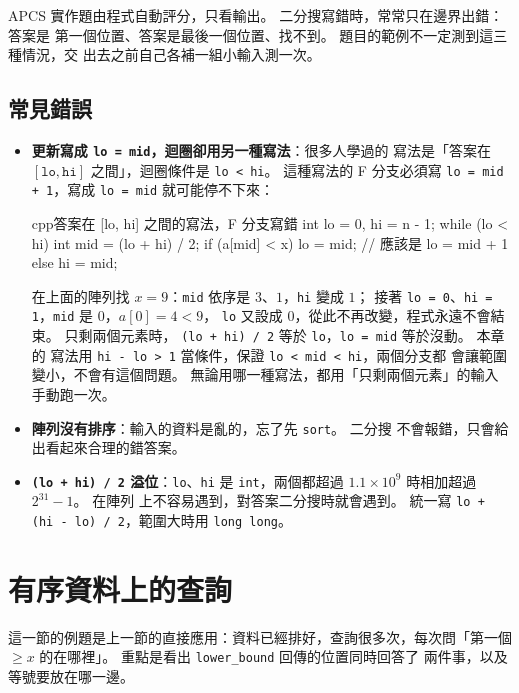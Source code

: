 \begin{apcsnote}
APCS 實作題由程式自動評分，只看輸出。 二分搜寫錯時，常常只在邊界出錯：答案是
第一個位置、答案是最後一個位置、找不到。 題目的範例不一定測到這三種情況，交
出去之前自己各補一組小輸入測一次。
\end{apcsnote}

\subsection{常見錯誤}

\begin{itemize}
\item \textbf{更新寫成 \texttt{lo = mid}，迴圈卻用另一種寫法}：很多人學過的
寫法是「答案在 $[\texttt{lo}, \texttt{hi}]$ 之間」，迴圈條件是
\texttt{lo < hi}。 這種寫法的 F 分支必須寫 \texttt{lo = mid + 1}，寫成
\texttt{lo = mid} 就可能停不下來：
\begin{code}{cpp}{答案在 [lo, hi] 之間的寫法，F 分支寫錯}
int lo = 0, hi = n - 1;
while (lo < hi) {
    int mid = (lo + hi) / 2;
    if (a[mid] < x) {
        lo = mid;          // 應該是 lo = mid + 1
    } else {
        hi = mid;
    }
}
\end{code}
在上面的陣列找 $x = 9$：\texttt{mid} 依序是 $3$、$1$，\texttt{hi} 變成 $1$；
接著 \texttt{lo = 0}、\texttt{hi = 1}，\texttt{mid} 是 $0$，$a[0] = 4 < 9$，
\texttt{lo} 又設成 $0$，從此不再改變，程式永遠不會結束。 只剩兩個元素時，
\texttt{(lo + hi) / 2} 等於 \texttt{lo}，\texttt{lo = mid} 等於沒動。 本章的
寫法用 \texttt{hi - lo > 1} 當條件，保證 \texttt{lo < mid < hi}，兩個分支都
會讓範圍變小，不會有這個問題。 無論用哪一種寫法，都用「只剩兩個元素」的輸入
手動跑一次。
\item \textbf{陣列沒有排序}：輸入的資料是亂的，忘了先 \texttt{sort}。 二分搜
不會報錯，只會給出看起來合理的錯答案。
\item \textbf{\texttt{(lo + hi) / 2} 溢位}：\texttt{lo}、\texttt{hi} 是
\texttt{int}，兩個都超過 $1.1 \times 10^9$ 時相加超過 $2^{31} - 1$。 在陣列
上不容易遇到，對答案二分搜時就會遇到。 統一寫
\texttt{lo + (hi - lo) / 2}，範圍大時用 \texttt{long long}。
\end{itemize}

\section{有序資料上的查詢}
\label{sec:bs-sorted}

這一節的例題是上一節的直接應用：資料已經排好，查詢很多次，每次問「第一個
$\ge x$ 的在哪裡」。 重點是看出 \texttt{lower\_bound} 回傳的位置同時回答了
兩件事，以及等號要放在哪一邊。

